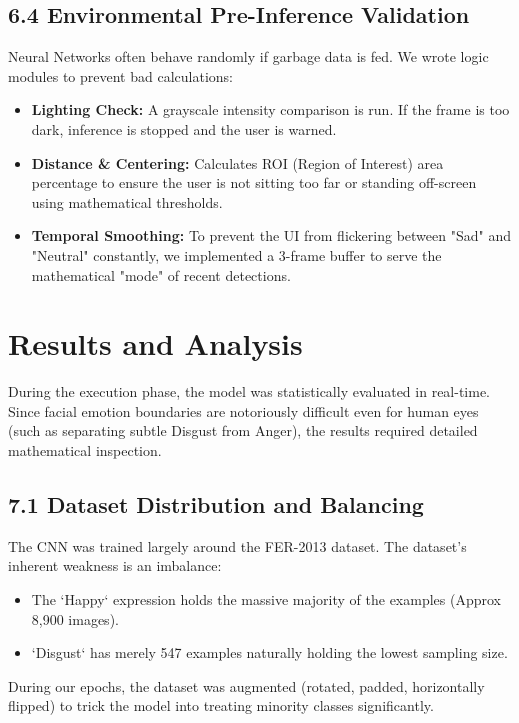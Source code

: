 \documentclass[12pt,a4paper]{report}
\begin{document}
\section*{6.4 Environmental Pre-Inference Validation}
Neural Networks often behave randomly if garbage data is fed. We wrote logic modules to prevent bad calculations:
\begin{itemize}
    \item \textbf{Lighting Check:} A grayscale intensity comparison is run. If the frame is too dark, inference is stopped and the user is warned.
    \item \textbf{Distance \& Centering:} Calculates ROI (Region of Interest) area percentage to ensure the user is not sitting too far or standing off-screen using mathematical thresholds.
    \item \textbf{Temporal Smoothing:} To prevent the UI from flickering between "Sad" and "Neutral" constantly, we implemented a 3-frame buffer to serve the mathematical "mode" of recent detections.
\end{itemize}

\clearpage


\chapter{Results and Analysis}

During the execution phase, the model was statistically evaluated in real-time. Since facial emotion boundaries are notoriously difficult even for human eyes (such as separating subtle Disgust from Anger), the results required detailed mathematical inspection.

\section*{7.1 Dataset Distribution and Balancing}
The CNN was trained largely around the FER-2013 dataset. The dataset's inherent weakness is an imbalance:
\begin{itemize}
    \item The `Happy` expression holds the massive majority of the examples (Approx 8,900 images).
    \item `Disgust` has merely 547 examples naturally holding the lowest sampling size.
\end{itemize}
During our epochs, the dataset was augmented (rotated, padded, horizontally flipped) to trick the model into treating minority classes significantly.
\end{document}
